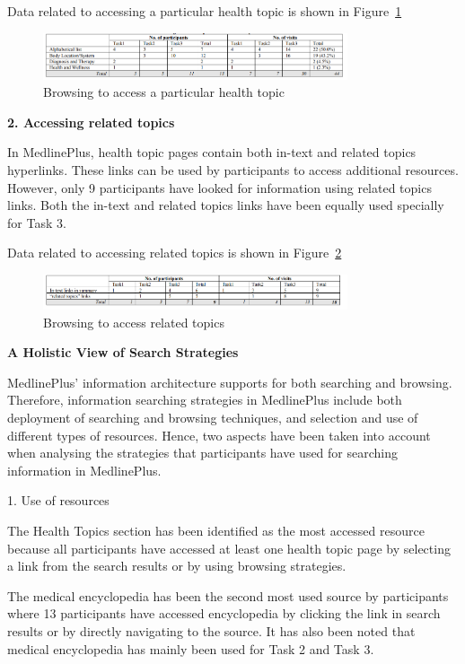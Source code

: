 \documentclass[]{article}
\begin{document}
Data related to accessing a particular health topic is shown in Figure~\ref{fig20}

\begin{figure}[t!]
	\includegraphics[width=0.8\textwidth]{Capture20.png}
	\caption{ Browsing to access a particular health topic \label{fig20}}
\end{figure} 

\textbf{2. Accessing related topics}

In MedlinePlus, health topic pages contain both in-text and related topics hyperlinks. These links can be used by participants to access additional resources. However, only 9 participants have looked for information using related topics links. Both the in-text and related topics links have been equally used specially for Task 3.   

Data related to accessing related topics is shown in Figure~\ref{fig21}

\begin{figure}[t!]
	\includegraphics[width=0.8\textwidth]{Capture21.png}
	\caption{ Browsing to access related topics \label{fig21}}
\end{figure}  

     
\textbf{A Holistic View of Search Strategies}

MedlinePlus' information architecture supports for both searching and browsing. Therefore, information searching strategies in MedlinePlus include both  deployment of searching and browsing techniques, and selection and use of different types of resources. Hence, two aspects have been taken into account when analysing the strategies that participants have used for searching information in MedlinePlus. 

1. Use of resources

The Health Topics section has been identified as the most accessed resource because all participants have accessed at least one health topic page by selecting a link from the search results or by using browsing strategies. 

The medical encyclopedia has been the second most used source by participants where 13 participants have accessed encyclopedia by clicking the link in search results or by directly navigating to the source. It has also been noted that medical encyclopedia has mainly been used for Task 2 and Task 3.
\end{document}

